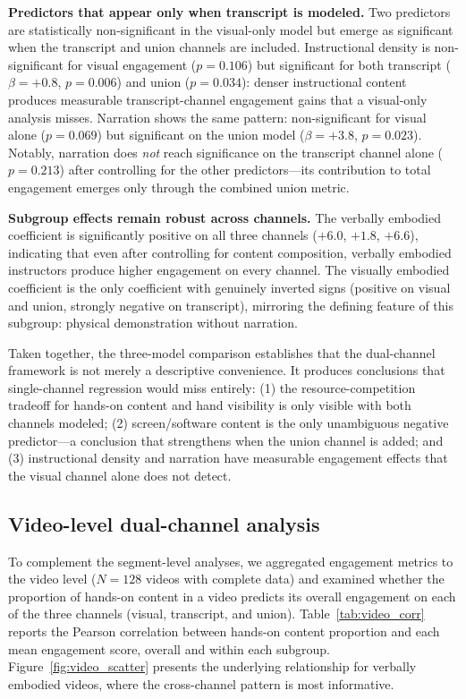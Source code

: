 \documentclass[fleqn,10pt]{wlscirep}
\begin{document}
\textbf{Predictors that appear only when transcript is modeled.} Two predictors are statistically non-significant in the visual-only model but emerge as significant when the transcript and union channels are included. Instructional density is non-significant for visual engagement ($p = 0.106$) but significant for both transcript ($\beta = +0.8$, $p = 0.006$) and union ($p = 0.034$): denser instructional content produces measurable transcript-channel engagement gains that a visual-only analysis misses. Narration shows the same pattern: non-significant for visual alone ($p = 0.069$) but significant on the union model ($\beta = +3.8$, $p = 0.023$). Notably, narration does \emph{not} reach significance on the transcript channel alone ($p = 0.213$) after controlling for the other predictors---its contribution to total engagement emerges only through the combined union metric.

\textbf{Subgroup effects remain robust across channels.} The verbally embodied coefficient is significantly positive on all three channels ($+6.0$, $+1.8$, $+6.6$), indicating that even after controlling for content composition, verbally embodied instructors produce higher engagement on every channel. The visually embodied coefficient is the only coefficient with genuinely inverted signs (positive on visual and union, strongly negative on transcript), mirroring the defining feature of this subgroup: physical demonstration without narration.

Taken together, the three-model comparison establishes that the dual-channel framework is not merely a descriptive convenience. It produces conclusions that single-channel regression would miss entirely: (1) the resource-competition tradeoff for hands-on content and hand visibility is only visible with both channels modeled; (2) screen/software content is the only unambiguous negative predictor---a conclusion that strengthens when the union channel is added; and (3) instructional density and narration have measurable engagement effects that the visual channel alone does not detect.


\subsection*{Video-level dual-channel analysis}

To complement the segment-level analyses, we aggregated engagement metrics to the video level ($N = 128$ videos with complete data) and examined whether the proportion of hands-on content in a video predicts its overall engagement on each of the three channels (visual, transcript, and union). Table~\ref{tab:video_corr} reports the Pearson correlation between hands-on content proportion and each mean engagement score, overall and within each subgroup. Figure~\ref{fig:video_scatter} presents the underlying relationship for verbally embodied videos, where the cross-channel pattern is most informative.
\end{document}
